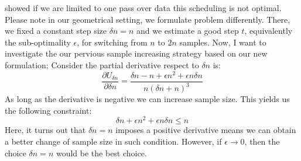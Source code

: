 \documentclass{article}
\begin{document}
showed if we are limited to one pass over data this scheduling is not optimal.
Please note in our geometrical setting, we formulate problem differently.
There, we fixed a constant step size $\delta n = n$ and we estimate a good step $t$, equivalently the sub-optimality $\epsilon$, for switching from
$n$ to $2n$ samples.
Now, I want to investigate the our pervious sample increasing strategy based on
our new formulation; Consider the partial derivative respect to $\delta n$ is:
\begin{equation*}
	\frac{\partial U_{\delta n}}{\partial \delta n} = 
	\frac{\delta n - n + \epsilon n^2
	+ \epsilon n \delta n}{n(\delta n + n)^3}
\end{equation*}
As long as the
derivative is negative we can increase sample size. This yields us the following
constraint: 
\begin{equation*}
	\delta n + \epsilon n^2 + \epsilon n \delta n \leq n 
\end{equation*}
Here, it turns out that $\delta n = n$ imposes a positive derivative means
we can obtain a better change of sample size in such condition. However, if
$\epsilon \rightarrow 0$, then the choice $\delta n = n$ would be the best
choice.\\
\end{document}
